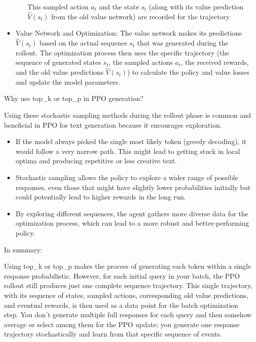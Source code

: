 \documentclass[10pt,a4paper]{report}
\begin{document}
\begin{itemize}
\begin{itemize}
        This sampled action $a_t$ and the state $s_t$ (along with its value prediction $\hat{V}(s_t)$ from the old value network) are recorded for the trajectory.
		\end{itemize}
\item    Value Network and Optimization: The value network makes its predictions $\hat{V}(s_t)$ based on the actual sequence $s_t$ that was generated during the rollout. The optimization process then uses the specific trajectory (the sequence of generated states $s_t$, the sampled actions $a_t$, the received rewards, and the old value predictions $\hat{V}(s_t)$) to calculate the policy and value losses and update the model parameters.
\end{itemize}
Why use top\_k or top\_p in PPO generation?

Using these stochastic sampling methods during the rollout phase is common and beneficial in PPO for text generation because it encourages exploration.
\begin{itemize}
\item    If the model always picked the single most likely token (greedy decoding), it would follow a very narrow path. This might lead to getting stuck in local optima and producing repetitive or less creative text.
\item    Stochastic sampling allows the policy to explore a wider range of possible responses, even those that might have slightly lower probabilities initially but could potentially lead to higher rewards in the long run.
\item    By exploring different sequences, the agent gathers more diverse data for the optimization process, which can lead to a more robust and better-performing policy.
\end{itemize}
In summary:

Using top\_k or top\_p makes the process of generating each token within a single response probabilistic. However, for each initial query in your batch, the PPO rollout still produces just one complete sequence trajectory. This single trajectory, with its sequence of states, sampled actions, corresponding old value predictions, and eventual rewards, is then used as a data point for the batch optimization step. You don't generate multiple full responses for each query and then somehow average or select among them for the PPO update; you generate one response trajectory stochastically and learn from that specific sequence of events.
\end{document}
